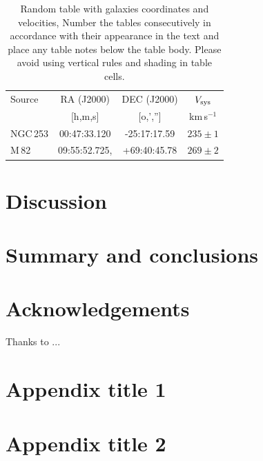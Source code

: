\documentclass[final,5p,times,twocolumn,authoryear]{elsarticle}
\newcommand{\kms}{km\,s$^{-1}$}
\begin{document}
\begin{table}
\begin{tabular}{l c c c} 
 \hline
 Source & RA (J2000) & DEC (J2000) & $V_{\rm sys}$ \\ 
        & [h,m,s]    & [o,','']    & \kms          \\
 \hline
 NGC\,253 & 	00:47:33.120 & -25:17:17.59 & $235 \pm 1$ \\ 
 M\,82 & 09:55:52.725, & +69:40:45.78 & $269 \pm 2$ 	 \\ 
 \hline
\end{tabular}
\caption{Random table with galaxies coordinates and velocities, Number the tables consecutively in
accordance with their appearance in the text and place any table notes below the table body. Please avoid using vertical rules and shading in table cells.
}
\label{Table1}
\end{table}


\section{Discussion}
\lipsum[4]

\section{Summary and conclusions}
\lipsum[1-4]


\section*{Acknowledgements}
Thanks to ...

\appendix

\section{Appendix title 1}

\section{Appendix title 2}

 







\end{document}
